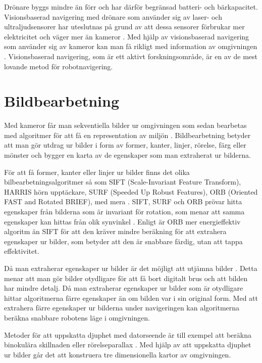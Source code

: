 Drönare byggs mindre än förr och har därför begränsad batteri- och bärkapacitet. Visionsbaserad navigering med drönare som använder sig av laser- och ultraljudsensorer har uteslutnas på grund av att dessa sensorer förbrukar mer elektricitet och väger mer än kameror \citep{6385934}. Med hjälp av visionsbaserad navigering som använder sig av kameror kan man få rikligt med information av omgivningen \citep{geospatial}. Visionsbaserad navigering, som är ett aktivt forskningsområde, är en av de mest lovande metod för robotnavigering.

\section{Bildbearbetning}

Med kameror får man sekventiella bilder ur omgivningen som sedan bearbetas med algoritmer för att få en representation av miljön \citep{982903}. Bildbearbetning betyder att man gör utdrag ur bilder i form av former, kanter, linjer, rörelse, färg eller mönster och bygger en karta av de egenskaper som man extraherat ur bilderna. 

För att få former, kanter eller linjer ur bilder finns det olika bilbearbetningsalgoritmer så som SIFT (Scale-Invariant Feature Transform), HARRIS hörn upptäckare, SURF (Speeded Up Robust Features), ORB (Oriented FAST and Rotated BRIEF), med mera \citep{orb, slamproblem, mapbuildingsift}. SIFT, SURF och ORB prövar hitta egenskaper från bilderna som är invariant för rotation, som menar att samma egenskaper kan hittas från olik synvinkel \citep{orb}. Enligt \cite{orb} är ORB mer energieffektiv algoritm än SIFT för att den kräver mindre beräkning för att extrahera egenskaper ur bilder, som betyder att den är snabbare färdig, utan att tappa effektivitet.

Då man extraherar egenskaper ur bilder är det möjligt att utjämna bilder \citep{mapbuildingsift}. Detta menar att man gör bilder otydligare för att få bort digitalt brus och att bilden har mindre detalj. Då man extraherar egenskaper ur bilder som är otydligare hittar algoritmerna färre egenskaper än om bilden var i sin original form. Med att extrahera färre egenskaper ur bilderna under navigeringen kan algoritmerna beräkna snabbare robotens läge i omgivningen. 

Metoder för att uppskatta djuphet med datorseende är till exempel att beräkna binokulära skillnaden eller rörelseparallax \citep{suomimainittu}. Med hjälp av att uppskatta djuphet ur bilder går det att konstruera tre dimensionella kartor av omgivningen.

